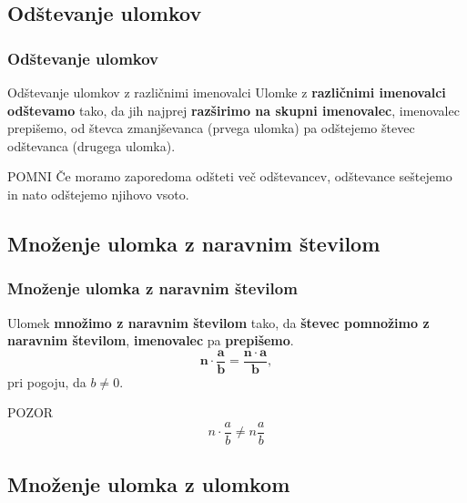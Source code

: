     \subsection{Odštevanje ulomkov}

        \begin{frame}[t]
            \frametitle{Odštevanje ulomkov}

            \begin{alertblock}{Odštevanje ulomkov z različnimi imenovalci}
                Ulomke z \textbf{različnimi imenovalci odštevamo} tako, da jih najprej \textbf{razširimo na skupni imenovalec}, imenovalec prepišemo, od števca zmanjševanca (prvega ulomka) pa odštejemo števec odštevanca (drugega ulomka). 
            \end{alertblock}

            \begin{block}{POMNI}
                Če moramo zaporedoma odšteti več odštevancev, odštevance seštejemo in nato odštejemo njihovo vsoto.
            \end{block}

        \end{frame}

    \subsection{Množenje ulomka z naravnim številom}

        \begin{frame}[t]
            \frametitle{Množenje ulomka z naravnim številom}

            \begin{alertblock}{}
                Ulomek \textbf{množimo z naravnim številom} tako, da \textbf{števec pomnožimo z naravnim številom}, \textbf{imenovalec} pa \textbf{prepišemo}.
                $$ \mathbf{n\cdot\frac{a}{b}=\frac{n\cdot a}{b}}, $$ pri pogoju, da $b\neq 0$.
            \end{alertblock}        
            
            \begin{exampleblock}{POZOR}
                $$ n\cdot\frac{a}{b}\neq n\frac{a}{b} $$
            \end{exampleblock}
        \end{frame}


    \subsection{Množenje ulomka z ulomkom}

